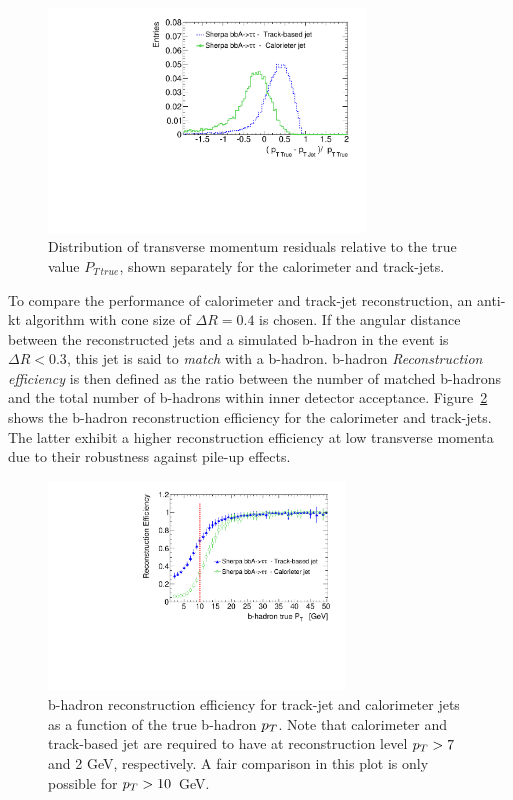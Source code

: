\begin{figure}[tp]
\centering
\includegraphics[width=0.75\textwidth]{figure/trackjet/residuals2.pdf}
\caption{Distribution of transverse momentum residuals relative to the true value $P_{T \, true}$,
shown separately for the calorimeter and track-jets.}
\label{fig:residuals}
\end{figure}    

To compare the performance of calorimeter and track-jet reconstruction, an anti-kt algorithm with cone size of $\Delta R = 0.4$ is chosen.
If the angular distance between the reconstructed jets and a simulated b-hadron in the event is $\Delta R  < 0.3$,
this jet is said to \emph{match} with a b-hadron. 
 b-hadron \emph{Reconstruction efficiency} is then defined as the ratio between the number of matched b-hadrons
and the total number of b-hadrons within inner detector acceptance. Figure~\ref{fig:recoEff} shows the  
b-hadron reconstruction efficiency for the calorimeter and track-jets. The latter exhibit a higher reconstruction efficiency at low 
transverse momenta due to their robustness against  pile-up effects.
\begin{figure}[tp]
\centering
\includegraphics[width=0.7\textwidth]{figure/trackjet/rec_eff2.pdf}
\caption{b-hadron reconstruction efficiency for track-jet and calorimeter jets  as a 
function of the true b-hadron $p_{T}$. Note that calorimeter  and track-based jet are required to have at 
reconstruction level $p_{T} > 7$ and 2 GeV, respectively. A fair comparison in this plot is only possible
for $p_{T} > 10$~GeV.}
\label{fig:recoEff}
\end{figure}    

